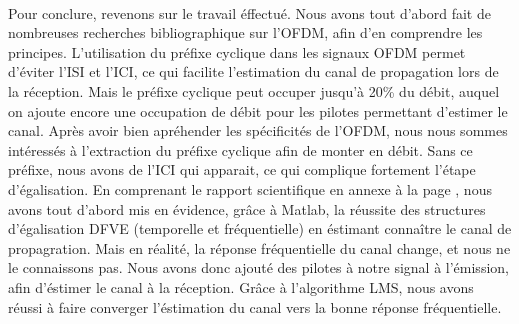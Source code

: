 \documentclass[a4paper, 11pt, oneside, oldfontcommands]{memoir}
\newcounter{th}[chapter]
\begin{document}
\paragraph{}
Pour conclure, revenons sur le travail éffectué. Nous avons tout d'abord fait de nombreuses recherches bibliographique sur l'OFDM, afin d'en comprendre les principes. L'utilisation du préfixe cyclique dans les signaux OFDM permet d'éviter l'ISI et l'ICI, ce qui facilite l'estimation du canal de propagation lors de la réception. Mais le préfixe cyclique peut occuper jusqu'à 20\% du débit, auquel on ajoute encore une occupation de débit pour les pilotes permettant d'estimer le canal. Après avoir bien apréhender les spécificités de l'OFDM, nous nous sommes intéressés à l'extraction du préfixe cyclique afin de monter en débit. Sans ce préfixe, nous avons de l'ICI qui apparait, ce qui complique fortement l'étape d'égalisation. En comprenant le rapport scientifique \cite{sujet} en annexe à la page \pageref{annexe}, nous avons tout d'abord mis en évidence, grâce à Matlab, la réussite des structures d'égalisation DFVE (temporelle et fréquentielle) en éstimant connaître le canal de propagration. Mais en réalité, la réponse fréquentielle du canal change, et nous ne le connaissons pas. Nous avons donc ajouté des pilotes à notre signal à l'émission, afin d'éstimer le canal à la réception. Grâce à l'algorithme LMS, nous avons réussi à faire converger l'éstimation du canal vers la bonne réponse fréquentielle. 






\newpage


\appendix
\nocite{*}
%
\newpage
 \listoffigures
 \printindex
 
  
\end{document}
